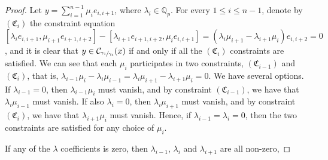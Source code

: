 \documentclass[12pt]{article}
\begin{document}
\begin{proof}
Let $y=\sum_{i=1}^{n-1}\mu_i e_{i,i+1}$, where $\lambda_i\in\mathbb{Q}_p$.
For every $1\leq i\leq n-1$, denote by $(\mathfrak{C}_i)$ the constraint equation $[\lambda_i e_{i,i+1},\mu_{i+1}e_{i+1,i+2}]-[\lambda_{i+1}e_{i+1,i+2},\mu_i e_{i,i+1}]=(\lambda_i\mu_{i+1}-\lambda_{i+1}\mu_i)e_{i,i+2}=0$, and it is clear that $y\in\mathcal{C}_{\sfrac{\gamma_1}{\gamma_3}}(x)$ if and only if all the $(\mathfrak{C}_i)$ constraints are satisfied. We can see that each $\mu_i$ participates in two constraints, $(\mathfrak{C}_{i-1})$ and $(\mathfrak{C}_i)$, that is, $\lambda_{i-1}\mu_i-\lambda_i\mu_{i-1}=\lambda_i\mu_{i+1}-\lambda_{i+1}\mu_i=0$. We have several options. If $\lambda_{i-1}=0$, then $\lambda_{i-1}\mu_i$ must vanish, and by constraint $(\mathfrak{C}_{i-1})$, we have that $\lambda_i\mu_{i-1}$ must vanish. If also $\lambda_i=0$, then $\lambda_i\mu_{i+1}$ must vanish, and by constraint $(\mathfrak{C}_i)$, we have that $\lambda_{i+1}\mu_i$ must vanish. Hence, if $\lambda_{i-1}=\lambda_i=0$, then the two constraints are satisfied for any choice of $\mu_i$.



If any of the $\lambda$ coefficients is zero, then $\lambda_{i-1}$, $\lambda_i$ and $\lambda_{i+1}$ are all non-zero, 


\end{proof}
\end{document}

